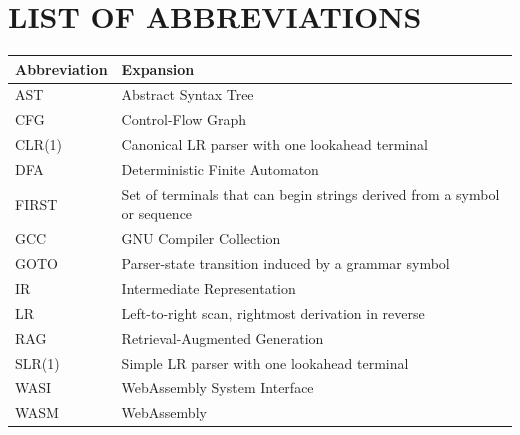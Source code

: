 \documentclass[12pt,a4paper,oneside]{report}
\begin{document}
\chapter*{LIST OF ABBREVIATIONS}
\begin{longtable}{p{}p{}}
\toprule
\textbf{Abbreviation} & \textbf{Expansion}\\
\midrule
AST & Abstract Syntax Tree\\
CFG & Control-Flow Graph\\
CLR(1) & Canonical LR parser with one lookahead terminal\\
DFA & Deterministic Finite Automaton\\
FIRST & Set of terminals that can begin strings derived from a symbol or sequence\\
GCC & GNU Compiler Collection\\
GOTO & Parser-state transition induced by a grammar symbol\\
IR & Intermediate Representation\\
LR & Left-to-right scan, rightmost derivation in reverse\\
RAG & Retrieval-Augmented Generation\\
SLR(1) & Simple LR parser with one lookahead terminal\\
WASI & WebAssembly System Interface\\
WASM & WebAssembly\\
\bottomrule
\end{longtable}
\clearpage
\end{document}

